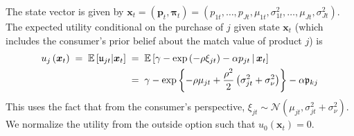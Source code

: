 \documentclass[11pt]{article}
\newcommand{\E}{\mathbb{E}}
\newcommand{\N}{\mathcal{N}}
\begin{document}
\noindent The state vector is given by $\boldsymbol{x}_{t}=\left(\boldsymbol{p}_{t}, \boldsymbol{\pi}_{t}\right)=\left(p_{1 t}, \ldots, p_{J t}, \mu_{1 t}, \sigma_{1 t}^{2}, \ldots, \mu_{J t}, \sigma_{J t}^{2}\right)$. The expected utility conditional on the purchase of $j$ given state $\boldsymbol{x}_t$ (which includes the consumer's prior belief about the match value of product $j$) is
\begin{align}
u_{j}\left(\boldsymbol{x}_{t}\right) \; = \; \E\left[ \mathfrak{u}_{jt} \middle| \boldsymbol{x}_{t} \right] \; & = \;  \E\left[\gamma-\exp \left(-\rho \xi_{j t}\right)-\alpha p_{j t}\, \middle|\, \boldsymbol{x}_{t}\right] \notag \\
& = \; \gamma - \exp \left\{ -\rho \mu_{jt} + \frac{\rho^2}{2} \left( \sigma^2_{jt} + \sigma^2_{\nu}\right) \right\} - \alpha \mathfrak{p}_{kj} 
\end{align}
This uses the fact that from the consumer's perspective, $\xi_{jt} \sim \N(\mu_{jt}, \sigma^2_{jt} + \sigma^2_\nu)$. We normalize the utility from the outside option such that $u_0 \left( \boldsymbol{x}_t \right) = 0$. 
\end{document}
